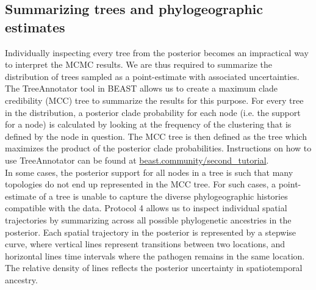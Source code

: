\documentclass{article}
\begin{document}
\subsection*{Summarizing trees and phylogeographic estimates}

Individually inspecting every tree from the posterior becomes an impractical way to interpret the MCMC results. We are thus required to summarize the distribution of trees sampled as a point-estimate with associated uncertainties. The TreeAnnotator tool in BEAST allows us to create a maximum clade credibility (MCC) tree to summarize the results for this purpose. For every tree in the distribution, a posterior clade probability for each node (i.e. the support for a node) is calculated by looking at the frequency of the clustering that is defined by the node in question. The MCC tree is then defined as the tree which maximizes the product of the posterior clade probabilities. Instructions on how to use TreeAnnotator can be found at \url{beast.community/second_tutorial}. \\

In some cases, the posterior support for all nodes in a tree is such that many topologies do not end up represented in the MCC tree. For such cases, a point-estimate of a tree is unable to capture the diverse phylogeographic histories compatible with the data. Protocol 4 allows us to inspect individual spatial trajectories by summarizing across all possible phylogenetic ancestries in the posterior. Each spatial trajectory in the posterior is represented by a stepwise curve, where vertical lines represent transitions between two locations, and horizontal lines time intervals where the pathogen remains in the same location. The relative density of lines reflects the posterior uncertainty in spatiotemporal ancestry. 
\end{document}
